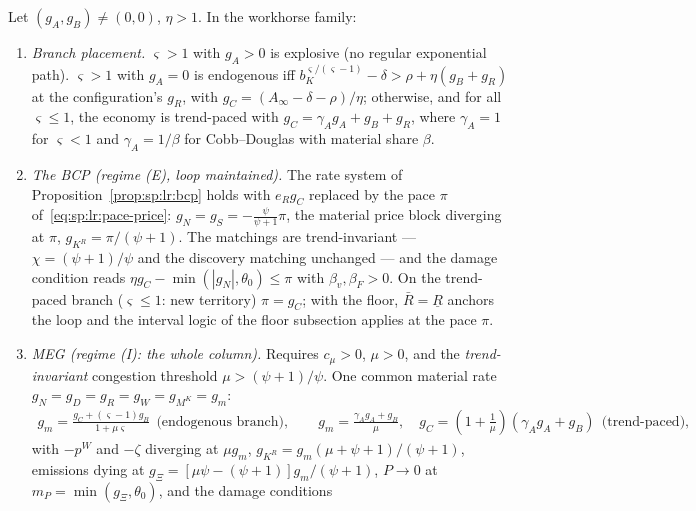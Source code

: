 \begin{proposition}\label{prop:sp:wh:trend}
Let $\left(g_A,g_B\right)\ne\left(0,0\right)$, $\eta>1$. In the workhorse family:
\begin{enumerate}
    \item \emph{Branch placement.} $\varsigma>1$ with $g_A>0$ is explosive (no regular
    exponential path). $\varsigma>1$ with $g_A=0$ is endogenous iff
    $b_K^{\varsigma/\left(\varsigma-1\right)}-\delta>\rho+\eta\left(g_B+g_R\right)$ at the
    configuration's $g_R$, with $g_C=\left(A_\infty-\delta-\rho\right)/\eta$; otherwise, and
    for all $\varsigma\le1$, the economy is trend-paced with
    $g_C=\gamma_Ag_A+g_B+g_R$, where $\gamma_A=1$ for $\varsigma<1$ and $\gamma_A=1/\beta$
    for Cobb--Douglas with material share $\beta$.
    \item \emph{The BCP (regime (E), loop maintained).} The rate system of
    Proposition~\ref{prop:sp:lr:bcp} holds with $e_Rg_C$ replaced by the pace $\pi$
    of~\eqref{eq:sp:lr:pace-price}: $g_N=g_S=-\frac{\psi}{\psi+1}\pi$, the material price
    block diverging at $\pi$, $g_{K^R}=\pi/\left(\psi+1\right)$. The matchings are
    trend-invariant --- $\chi=\left(\psi+1\right)/\psi$ and the discovery matching
    unchanged --- and the damage condition reads
    $\eta g_C-\min\left(\left|g_N\right|,\theta_0\right)\le\pi$ with $\beta_v,\beta_F>0$.
    On the trend-paced branch ($\varsigma\le1$: new territory) $\pi=g_C$; with the floor,
    $\bar R=\underline R$ anchors the loop and the interval logic of the floor subsection
    applies at the pace $\pi$.
    \item \emph{MEG (regime (I): the whole column).} Requires $c_\mu>0$, $\mu>0$, and the
    \emph{trend-invariant} congestion threshold $\mu>\left(\psi+1\right)/\psi$. One common
    material rate $g_N=g_D=g_R=g_W=g_{M^K}=g_m$:
    \begin{align}
    g_m=\frac{g_C+\left(\varsigma-1\right)g_B}{1+\mu\varsigma}
    \ \ \text{(endogenous branch)},
    \qquad
    g_m=\frac{\gamma_Ag_A+g_B}{\mu},
    \quad
    g_C=\left(1+\tfrac{1}{\mu}\right)\left(\gamma_Ag_A+g_B\right)
    \ \ \text{(trend-paced)},
    \label{eq:sp:wh:trend-gm}
    \end{align}
    with $-p^W$ and $-\zeta$ diverging at $\mu g_m$, $g_{K^R}=g_m\left(\mu+\psi+1\right)/\left(\psi+1\right)$,
    emissions dying at $g_\Xi=\left[\mu\psi-\left(\psi+1\right)\right]g_m/\left(\psi+1\right)$,
    $P\to0$ at $m_P=\min\left(g_\Xi,\theta_0\right)$, and the damage conditions

\end{enumerate}
\end{proposition}
